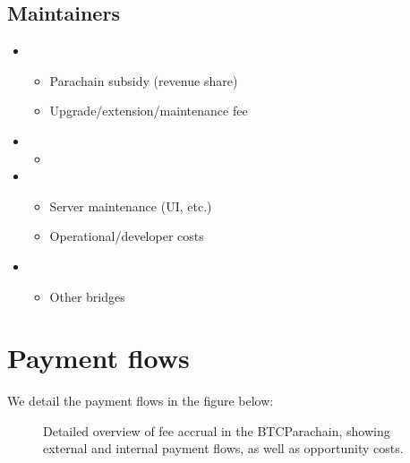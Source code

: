 \documentclass[a4paper,10pt,english]{sphinxmanual}
\begin{document}
\subsection{Maintainers}
\label{\detokenize{economics/fees:maintainers}}\begin{itemize}
\item {} 
\begin{itemize}
\item {} 
Parachain subsidy (revenue share)

\item {} 
Upgrade/extension/maintenance fee

\end{itemize}

\item {} 
\begin{itemize}
\item {} 

\end{itemize}

\item {} 
\begin{itemize}
\item {} 
Server maintenance (UI, etc.)

\item {} 
Operational/developer costs

\end{itemize}

\item {} 
\begin{itemize}
\item {} 
Other bridges

\end{itemize}

\end{itemize}


\section{Payment flows}
\label{\detokenize{economics/fees:payment-flows}}
We detail the payment flows in the figure below:

\begin{figure}[htbp]
\centering
\capstart

\noindent{}
\caption{Detailed overview of fee accrual in the BTC\sphinxhyphen{}Parachain, showing external and internal payment flows, as well as opportunity costs.}\label{\detokenize{economics/fees:id3}}\end{figure}
\end{document}
